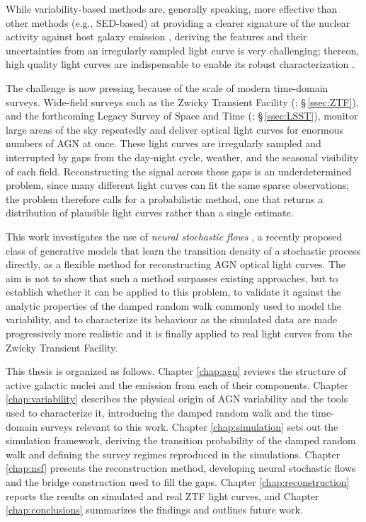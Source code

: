 While variability-based methods are, generally speaking, more effective than other methods (e.g., SED-based) at providing a clearer signature of the nuclear activity against host galaxy emission \parencite{Yu2025ScalableEztao}, deriving the features and their uncertainties from an irregularly sampled light curve is very challenging; thereon, high quality light curves are indispensable to enable its robust characterization \parencite{Kelly2014CARMA}. 

The challenge is now pressing because of the scale of modern time-domain surveys. Wide-field surveys such as the Zwicky Transient Facility (\cite{Bellm2019ZTF}; \S\,\ref{ssec:ZTF}), and the forthcoming Legacy Survey of Space and Time (\cite{Ivezi2019LSST}; \S\,\ref{ssec:LSST}), monitor large areas of the sky repeatedly and deliver optical light curves for enormous numbers of AGN at once. These light curves are irregularly sampled and interrupted by gaps from the day-night cycle, weather, and the seasonal visibility of each field. Reconstructing the signal across these gaps is an underdetermined problem, since many different light curves can fit the same sparse observations; the problem therefore calls for a probabilistic method, one that returns a distribution of plausible light curves rather than a single estimate.

This work investigates the use of \textit{neural stochastic flows} \parencite{Kiyohara2025SNF}, a recently proposed class of generative models that learn the transition density of a stochastic process directly, as a flexible method for reconstructing AGN optical light curves. The aim is not to show that such a method surpasses existing approaches, but to establish whether it can be applied to this problem, to validate it against the analytic properties of the damped random walk commonly used to model the variability, and to characterize its behaviour as the simulated data are made progressively more realistic and it is finally applied to real light curves from the Zwicky Transient Facility.

This thesis is organized as follows. Chapter \ref{chap:agn} reviews the structure of active galactic nuclei and the emission from each of their components. Chapter \ref{chap:variability} describes the physical origin of AGN variability and the tools used to characterize it, introducing the damped random walk and the time-domain surveys relevant to this work. Chapter \ref{chap:simulation} sets out the simulation framework, deriving the transition probability of the damped random walk and defining the survey regimes reproduced in the simulations. Chapter \ref{chap:nsf} presents the reconstruction method, developing neural stochastic flows and the bridge construction used to fill the gaps. Chapter \ref{chap:reconstruction} reports the results on simulated and real ZTF light curves, and Chapter \ref{chap:conclusions} summarizes the findings and outlines future work.
